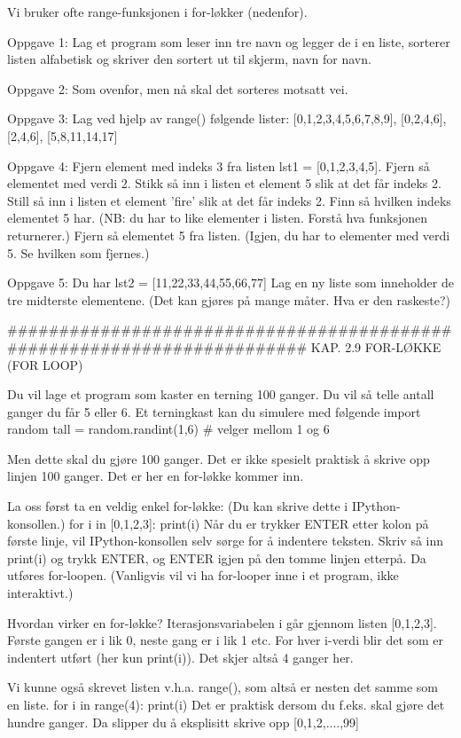 {Vi bruker ofte range-funksjonen i for-løkker (nedenfor). 




Oppgave 1: Lag et program som leser inn tre navn og legger de i en liste,
sorterer listen alfabetisk og skriver den sortert ut til skjerm, navn for navn. 


Oppgave 2: Som ovenfor, men nå skal det sorteres motsatt vei. 


Oppgave 3: Lag ved hjelp av range() følgende lister:
[0,1,2,3,4,5,6,7,8,9], [0,2,4,6], [2,4,6], [5,8,11,14,17] 


Oppgave 4: Fjern element med indeks 3 fra listen lst1 = [0,1,2,3,4,5].
Fjern så elementet med verdi 2.
Stikk så inn i listen et element 5 slik at det får indeks 2.
Still så inn i listen et element 'fire' slik at det får indeks 2.
Finn så hvilken indeks elementet 5 har.
(NB: du har to like elementer i listen. Forstå hva funksjonen returnerer.)
Fjern så elementet 5 fra listen.
(Igjen, du har to elementer med verdi 5. Se hvilken som fjernes.) 


Oppgave 5: Du har lst2 = [11,22,33,44,55,66,77]
Lag en ny liste som inneholder de tre midterste elementene.
(Det kan gjøres på mange måter. Hva er den raskeste?)

######################################################################## 
KAP. 2.9  FOR-LØKKE (FOR LOOP)

Du vil lage et program som kaster en terning 100 ganger.
Du vil så telle antall ganger du får 5 eller 6. 
Et terningkast kan du simulere med følgende 
import random
tall = random.randint(1,6)   # velger mellom 1 og 6

Men dette skal du gjøre 100 ganger.
Det er ikke spesielt praktisk å skrive opp linjen 100 ganger.
Det er her en for-løkke kommer inn. 

La oss først ta en veldig enkel for-løkke:
(Du kan skrive dette i IPython-konsollen.) 
for i in [0,1,2,3]:
    print(i)
Når du er trykker ENTER etter kolon på første linje,
vil IPython-konsollen selv sørge for å indentere teksten.
Skriv så inn print(i) og trykk ENTER, og ENTER igjen på den tomme linjen etterpå.
Da utføres for-loopen.
(Vanligvis vil vi ha for-looper inne i et program, ikke interaktivt.) 

Hvordan virker en for-løkke?
Iterasjonsvariabelen i går gjennom listen [0,1,2,3]. 
Første gangen er i lik 0, neste gang er i lik 1 etc.
For hver i-verdi blir det som er indentert utført (her kun print(i)).
Det skjer altså 4 ganger her. 

Vi kunne også skrevet listen v.h.a. range(), som altså er nesten det samme som en liste. 
for i in range(4): 
    print(i) 
Det er praktisk dersom du f.eks. skal gjøre det hundre ganger.
Da slipper du å eksplisitt skrive opp [0,1,2,....,99]


}
